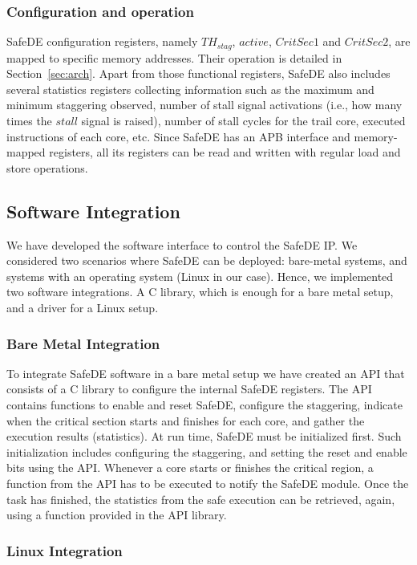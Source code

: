 \subsubsection{Configuration and operation}
SafeDE configuration registers, namely $TH_{stag}$, $active$, $CritSec1$ and $CritSec2$, are mapped to specific memory addresses. Their operation is detailed in Section~\ref{sec:arch}.
Apart from those functional registers, SafeDE also includes several statistics registers collecting information such as the maximum and minimum staggering observed, number of stall signal activations (i.e., how many times the $stall$ signal is raised), number of stall cycles for the trail core, executed instructions of each core, etc. 
Since SafeDE has an APB interface and memory-mapped registers, all its registers can be read and written with regular load and store operations.

\subsection{Software Integration}

We have developed the software interface to control the SafeDE IP. We considered two scenarios where SafeDE can be deployed: bare-metal systems, and systems with an operating system (Linux in our case). Hence, we implemented two software integrations. A C library, which is enough for a bare metal setup, and a driver for a Linux setup.

\subsubsection{Bare Metal Integration}
\label{sec:bare_metal}

To integrate SafeDE software in a bare metal setup we have created an API that consists of a C library to configure the internal SafeDE registers. The API contains functions to enable and reset SafeDE, configure the staggering, indicate when the critical section starts and finishes for each core, and gather the execution results (statistics).
At run time, SafeDE must be initialized first.
Such initialization includes configuring the staggering, and setting the reset and enable bits using the API. Whenever a core starts or finishes the critical region, a function from the API has to be executed to notify the SafeDE module. Once the task has finished, the statistics from the safe execution can be retrieved, again, using a function provided in the API library.

\subsubsection{Linux Integration}

